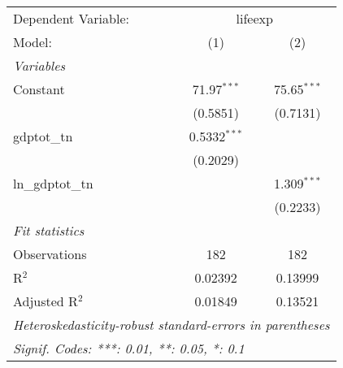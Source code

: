 \begingroup
\centering
\begin{tabular}{lcc}
   \tabularnewline \midrule \midrule
   Dependent Variable: & \multicolumn{2}{c}{lifeexp}\\
   Model:           & (1)            & (2)\\  
   \midrule
   \emph{Variables}\\
   Constant         & 71.97$^{***}$  & 75.65$^{***}$\\   
                    & (0.5851)       & (0.7131)\\   
   gdptot\_tn       & 0.5332$^{***}$ &   \\   
                    & (0.2029)       &   \\   
   ln\_gdptot\_tn   &                & 1.309$^{***}$\\   
                    &                & (0.2233)\\   
   \midrule
   \emph{Fit statistics}\\
   Observations     & 182            & 182\\  
   R$^2$            & 0.02392        & 0.13999\\  
   Adjusted R$^2$   & 0.01849        & 0.13521\\  
   \midrule \midrule
   \multicolumn{3}{l}{\emph{Heteroskedasticity-robust standard-errors in parentheses}}\\
   \multicolumn{3}{l}{\emph{Signif. Codes: ***: 0.01, **: 0.05, *: 0.1}}\\
\end{tabular}
\par\endgroup



